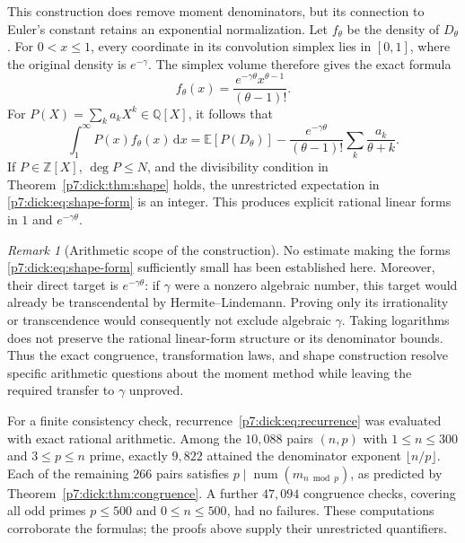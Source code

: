 \documentclass[11pt,a4paper]{article}
\theoremstyle{definition}
\theoremstyle{remark}
\newtheorem{remark}[theorem]{Remark}
\newcommand{\Q}{\mathbb Q}
\newcommand{\Z}{\mathbb Z}
\newcommand{\dd}{\,\mathrm d}
\numberwithin{equation}{section}
\begin{document}
This construction does remove moment denominators, but its connection to
Euler's constant retains an exponential normalization.  Let $f_\theta$
be the density of $D_\theta$.  For $0<x\le1$, every coordinate in its
convolution simplex lies in $[0,1]$, where the original density is
$e^{-\gamma}$.  The simplex volume therefore gives the exact formula
\begin{equation}\label{p7:dick:eq:shape-density}
 f_\theta(x)=\frac{e^{-\gamma\theta}x^{\theta-1}}{(\theta-1)!}.
\end{equation}
For $P(X)=\sum_k a_kX^k\in\Q[X]$, it follows that
\begin{equation}\label{p7:dick:eq:shape-form}
 \int_1^\infty P(x)f_\theta(x)\dd x
 =\mathbb E[P(D_\theta)]
  -\frac{e^{-\gamma\theta}}{(\theta-1)!}
     \sum_k\frac{a_k}{\theta+k}.
\end{equation}
If $P\in\Z[X]$, $\deg P\le N$, and the divisibility condition in
Theorem~\ref{p7:dick:thm:shape} holds, the unrestricted expectation in
\eqref{p7:dick:eq:shape-form} is an integer.  This produces explicit rational
linear forms in $1$ and $e^{-\gamma\theta}$.

\begin{remark}[Arithmetic scope of the construction]\label{p7:dick:rem:gamma-gap}
No estimate making the forms \eqref{p7:dick:eq:shape-form} sufficiently small
has been established here.  Moreover, their direct target is
$e^{-\gamma\theta}$: if $\gamma$ were a nonzero algebraic number, this
target would already be transcendental by Hermite--Lindemann.  Proving only
its irrationality or transcendence would consequently not exclude
algebraic $\gamma$.  Taking logarithms does not preserve the rational
linear-form structure or its denominator bounds.  Thus the exact
congruence, transformation laws, and shape construction resolve specific
arithmetic questions about the moment method while leaving the required
transfer to $\gamma$ unproved.
\end{remark}

For a finite consistency check, recurrence~\eqref{p7:dick:eq:recurrence} was
evaluated with exact rational arithmetic.  Among the $10{,}088$ pairs
$(n,p)$ with $1\le n\le300$ and $3\le p\le n$ prime, exactly $9{,}822$
attained the denominator exponent $\lfloor n/p\rfloor$.  Each of the
remaining $266$ pairs satisfies
$p\mid\operatorname{num}(m_{n\bmod p})$, as predicted by
Theorem~\ref{p7:dick:thm:congruence}.  A further $47{,}094$ congruence checks,
covering all odd primes $p\le500$ and $0\le n\le500$, had no failures.
These computations corroborate the formulas; the proofs above supply
their unrestricted quantifiers.
\end{document}
